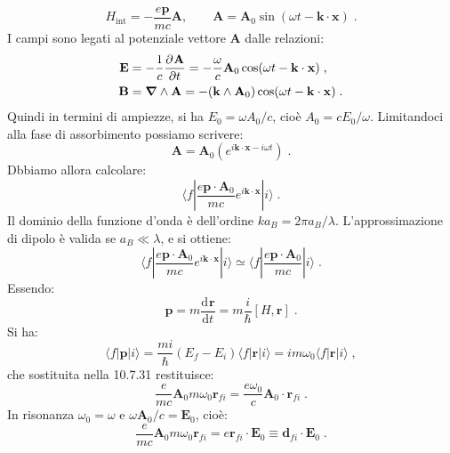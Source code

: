 \documentclass[10pt,a4paper]{report}
\theoremstyle{definition}
\newcommand{\pdev}[3][]{\frac{\partial^{#1} #2}{\partial #3^{#1}}}
\newcommand{\dev}[3][]{\frac{\mathrm{d}^{#1} #2}{\mathrm{d} #3^{#1}}}
\numberwithin{equation}{section}
\newcommand{\bra}{\langle}
\newcommand{\ket}{\rangle}
\newcommand{\bnabla}{\boldsymbol{\nabla}}
\begin{document}
\begin{equation}
H_{\mathrm{int}}=-\frac{e\mathbf{p}}{mc}\mathbf{A}, \qquad \mathbf{A}=\mathbf{A}_0\sin(\omega t-\mathbf{k}\cdot\mathbf{x})\;.
\end{equation}
I campi sono legati al potenziale vettore $\mathbf{A}$ dalle relazioni:
\begin{align}
\mathbf{E} &= -\frac{1}{c}\pdev{\mathbf{A}}{t}=-\frac{\omega}{c}\mathbf{A}_0\cos(\omega t-\mathbf{k}\cdot\mathbf{x}) \notag\;, \\
\mathbf{B} &= \bnabla\wedge \mathbf{A}=-(\mathbf{k}\wedge\mathbf{A}_0)\cos(\omega t-\mathbf{k}\cdot\mathbf{x})\;.
\end{align}
Quindi in termini di ampiezze, si ha $E_0=\omega A_0/c$, cioè $A_0=cE_0/\omega$. Limitandoci alla fase di assorbimento possiamo scrivere:
\begin{equation}
\mathbf{A}=\mathbf{A}_0\left(e^{i\mathbf{k}\cdot\mathbf{x}-i\omega t}\right)\;.
\end{equation}
Dbbiamo allora calcolare:
\begin{equation}
\bra f|\frac{e\mathbf{p}\cdot\mathbf{A}_0}{mc}e^{i\mathbf{k}\cdot\mathbf{x}}|i\ket\;.
\end{equation}
Il dominio della funzione d'onda è dell'ordine $ka_B=2\pi a_B/\lambda$. L'approssimazione di dipolo è valida se $a_B\ll \lambda$, e si ottiene:
\begin{equation}
\bra f|\frac{e\mathbf{p}\cdot\mathbf{A}_0}{mc}e^{i\mathbf{k}\cdot\mathbf{x}}|i\ket\simeq \bra f|\frac{e\mathbf{p}\cdot\mathbf{A}_0}{mc}|i\ket\;.
\end{equation}
Essendo:
\begin{equation}
\mathbf{p}=m\dev{\mathbf{r}}{t}=m\frac{i}{\hbar}[H,\mathbf{r}]\;.
\end{equation}
Si ha:
\begin{equation}
\bra f|\mathbf{p}|i\ket=\frac{mi}{\hbar}(E_f-E_i)\bra f|\mathbf{r}|i\ket=im\omega_0\bra f|\mathbf{r}|i\ket\;,
\end{equation}
che sostituita nella 10.7.31 restituisce:
\begin{equation*}
\frac{e}{mc}\mathbf{A}_0m\omega_0\mathbf{r}_{fi}=\frac{e\omega_0}{c}\mathbf{A}_0\cdot\mathbf{r}_{fi}\;.
\end{equation*}
In risonanza $\omega_0=\omega$ e $\omega \mathbf{A}_0/c=\mathbf{E}_0$, cioè:
\begin{equation}
\frac{e}{mc}\mathbf{A}_0m\omega_0\mathbf{r}_{fi}= e\mathbf{r}_{fi}\cdot\mathbf{E}_0\equiv \mathbf{d}_{fi}\cdot\mathbf{E}_0\;.
\end{equation}
\end{document}
